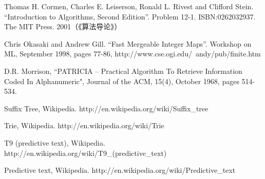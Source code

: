 \documentclass[UTF8]{article}
\begin{document}
\begin{thebibliography}{99}

Thomas H. Cormen, Charles E. Leiserson, Ronald L. Rivest and Clifford Stein.
``Introduction to Algorithms, Second Edition''. Problem 12-1. ISBN:0262032937. The MIT Press. 2001（《算法导论》）

Chris Okasaki and Andrew Gill. ``Fast Mergeable Integer
Maps''. Workshop on ML, September 1998, pages 77-86, http://www.cse.ogi.edu/~andy/pub/finite.htm

D.R. Morrison, ``PATRICIA -- Practical Algorithm To Retrieve  Information Coded In Alphanumeric", Journal of the ACM, 15(4), October 1968, pages 514-534.

Suffix Tree, Wikipedia. http://en.wikipedia.org/wiki/Suffix\_tree

Trie, Wikipedia. http://en.wikipedia.org/wiki/Trie

T9 (predictive text), Wikipedia. http://en.wikipedia.org/wiki/T9\_(predictive\_text)

Predictive text,
Wikipedia. http://en.wikipedia.org/wiki/Predictive\_text

\end{thebibliography}

\ifx\wholebook\relax\else
\end{document}
